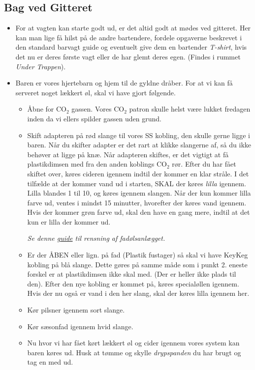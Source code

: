 \subsection{Bag ved Gitteret}
\label{sec:pre:bag-ved-gitteret}
\begin{itemize}
    \item For at vagten kan starte godt ud, er det altid godt at mødes ved gitteret.
    Her kan man lige få hilst på de andre bartendere, fordele opgaverne beskrevet i den standard
    barvagt guide og eventuelt give dem en bartender \textit{T-shirt}, hvis det nu er deres første vagt
    eller de har glemt deres egen.
    (Findes i rummet \textit{Under Trappen}).
    \item Baren er vores hjertebarn og hjem til de gyldne dråber.
    For at vi kan få serveret noget lækkert øl, skal vi have gjort følgende.
    \begin{itemize}
        \item Åbne for CO$_2$ gassen. Vores CO$_2$ patron skulle helst være lukket fredagen
        inden da vi ellers spilder gassen uden grund.
        \item Skift adapteren på rød slange til vores SS kobling, den skulle gerne ligge i baren.
        Når du skifter adapter er det rart at klikke slangerne af, så du ikke behøver at ligge på knæ.
        Når adapteren skiftes, er det vigtigt at få plastikdimsen med fra den anden koblings CO$_2$ rør.
        Efter du har fået skiftet over, køres cideren igennem indtil der kommer en klar stråle.
        I det tilfælde at der kommer vand ud i starten, SKAL der køres \textit{lilla} igennem.
        Lilla blandes 1 til 10, og køres igennem slangen. Når der kun kommer lilla farve ud, ventes i
        mindst 15 minutter, hvorefter der køres vand igennem. Hvis der kommer grøn farve ud, skal den
        have en gang mere, indtil at det kun er lilla der kommer ud.
        
        \textit{Se denne \href{https://media.fredagscafeen.dk/guides/rensningafanlaeg.pdf}{guide} til rensning af fadølsanlægget.}
        \item Er der ÅBEN eller lign. på fad (Plastik fustager) så skal vi have KeyKeg kobling på blå slange.
        Dette gøres på samme måde som i punkt 2. eneste forskel er at plastikdimsen ikke skal med.
        (Der er heller ikke plads til den).
        Efter den nye kobling er kommet på, køres specialøllen igennem.
        Hvis der nu også er vand i den her slang, skal der køres lilla igennem her.
        \item Kør pilsner igennem sort slange.
        \item Kør sæsonfad igennem hvid slange.
        \item Nu hvor vi har fået kørt lækkert øl og cider igennem vores system kan baren køres ud.
        Husk at tømme og skylle \textit{drypspanden} du har brugt og tag en med ud.
    \end{itemize}
\end{itemize}

